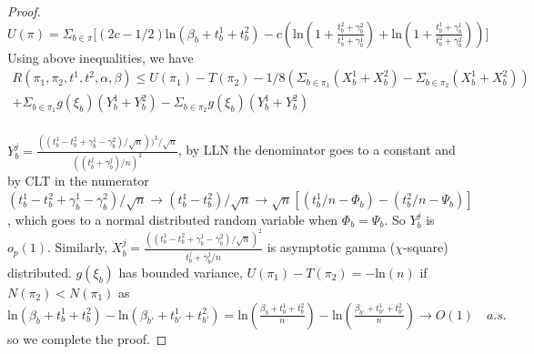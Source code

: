 \documentclass[aoas,preprint]{imsart}
\newtheorem{lemma}{Lemma}
\begin{document}
\begin{proof}
$U(\pi) = \Sigma_{b\in\pi}\big[(2c - 1/2) \text{ln}(\beta_b + t_b^1 + t_b^2) 
  - c(\text{ln}(1 + \frac{t_b^2 + \gamma_b^2}{t_b^1 + \gamma_b^1}) + \text{ln}(1 + \frac{t_b^1 + \gamma_b^1}{t_b^2 + \gamma_b^2}))\big]$\\
  
 Using above inequalities, we have 
 \begin{eqnarray*}
  R(\pi_1, \pi_2, t^1, t^2, \alpha, \beta)  \leq U(\pi_1) - T(\pi_2) - 1/8 (\Sigma_{b\in\pi_1}(X_b^1 + X_b^2) - \Sigma_{b\in\pi_2}(X_b^1 + X_b^2)) \\ 
 + \Sigma_{b\in\pi_1}g(\xi_b)(Y_b^1 + Y_b^2)  - \Sigma_{b\in\pi_2}g(\xi_ b)(Y_b^1 + Y_b^2)\\
 \end{eqnarray*}
 
 $Y_b^j =  \frac{((t_b^1 - t_b^2 + \gamma_b^1 - \gamma_b^2) / \sqrt{n}))^3 / \sqrt{n}}{((t_b^j + \gamma_b^j) /n)^2}$, by LLN the denominator goes to a constant and by CLT in the numerator $(t_b^1 - t_b^2 + \gamma_b^1 - \gamma_b^2) / \sqrt{n} \rightarrow (t_b^1 - t_b^2) / \sqrt{n} \rightarrow \sqrt{n}[(t_b^1 / n  - \Phi_b) - (t_b^2 / n - \Psi_b)]$, which goes to a normal distributed random variable when $\Phi_b = \Psi_b$. So $Y_b^j$ is $o_p(1)$. Similarly,  $X_b^j =  \frac{((t_b^1 - t_b^2 + \gamma_b^1 - \gamma_b^2) / \sqrt{n})^2}{t_b^j + \gamma_b^j / n}$ is asymptotic gamma ($\chi$-square) distributed.
$g(\xi_b)$ has bounded variance,
 $U(\pi_1) - T(\pi_2) = -\text{ln}(n)$ if $N(\pi_2) < N(\pi_1)$
 as $ \text{ln}(\beta_b + t_b^1 + t_b^2)  -  \text{ln}(\beta_{b'} + t_{b'}^1 + t_{b'}^2) =  \text{ln}(\frac{\beta_b + t_b^1 + t_b^2}{n})  -  \text{ln}(\frac{\beta_{b'} + t_{b'}^1 + t_{b'}^2}{n}) \rightarrow O(1) \quad a.s.$ so we complete the proof.




\end{proof}


\end{document}
